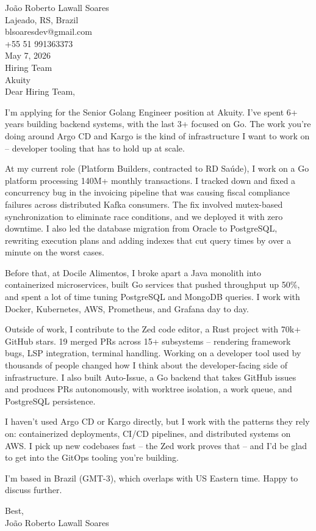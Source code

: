 \documentclass[11pt,a4paper]{article}
\begin{document}
\noindent Jo\~{a}o Roberto Lawall Soares\\
Lajeado, RS, Brazil\\
blsoaresdev@gmail.com\\
+55 51 991363373\\[12pt]

\noindent May 7, 2026\\[12pt]

\noindent Hiring Team\\
Akuity\\[12pt]

\noindent Dear Hiring Team,

I'm applying for the Senior Golang Engineer position at Akuity. I've spent 6+ years building backend systems, with the last 3+ focused on Go. The work you're doing around Argo CD and Kargo is the kind of infrastructure I want to work on -- developer tooling that has to hold up at scale.

At my current role (Platform Builders, contracted to RD Sa\'{u}de), I work on a Go platform processing 140M+ monthly transactions. I tracked down and fixed a concurrency bug in the invoicing pipeline that was causing fiscal compliance failures across distributed Kafka consumers. The fix involved mutex-based synchronization to eliminate race conditions, and we deployed it with zero downtime. I also led the database migration from Oracle to PostgreSQL, rewriting execution plans and adding indexes that cut query times by over a minute on the worst cases.

Before that, at Docile Alimentos, I broke apart a Java monolith into containerized microservices, built Go services that pushed throughput up 50\%, and spent a lot of time tuning PostgreSQL and MongoDB queries. I work with Docker, Kubernetes, AWS, Prometheus, and Grafana day to day.

Outside of work, I contribute to the Zed code editor, a Rust project with 70k+ GitHub stars. 19 merged PRs across 15+ subsystems -- rendering framework bugs, LSP integration, terminal handling. Working on a developer tool used by thousands of people changed how I think about the developer-facing side of infrastructure. I also built Auto-Issue, a Go backend that takes GitHub issues and produces PRs autonomously, with worktree isolation, a work queue, and PostgreSQL persistence.

I haven't used Argo CD or Kargo directly, but I work with the patterns they rely on: containerized deployments, CI/CD pipelines, and distributed systems on AWS. I pick up new codebases fast -- the Zed work proves that -- and I'd be glad to get into the GitOps tooling you're building.

I'm based in Brazil (GMT-3), which overlaps with US Eastern time. Happy to discuss further.

\vspace{12pt}
\noindent Best,\\
Jo\~{a}o Roberto Lawall Soares
\end{document}
